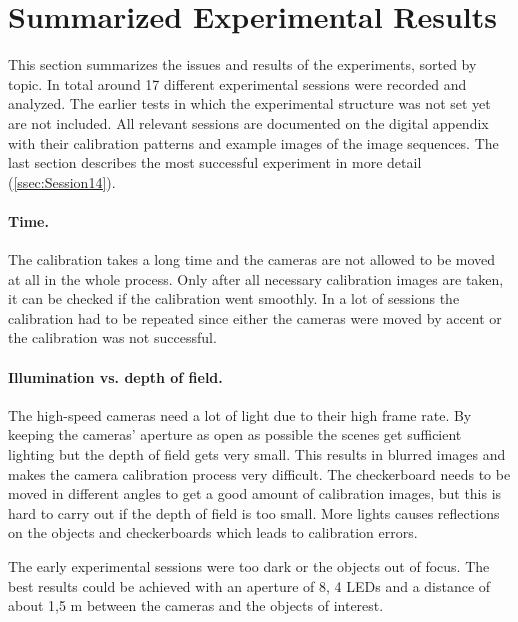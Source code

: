 \section{Summarized Experimental Results}\label{sec:ExperimentalResults}
This section summarizes the issues and results of the experiments, sorted by topic. In total around 17 different experimental sessions were recorded and analyzed. The earlier tests in which the experimental structure was not set yet are not included. All relevant sessions are documented on the digital appendix with their calibration patterns and example images of the image sequences. The last section describes the most successful experiment in more detail (\autoref{ssec:Session14}).

\paragraph{Time.}
The calibration takes a long time and the cameras are not allowed to be moved at all in the whole process. Only after all necessary calibration images are taken, it can be checked if the calibration went smoothly. In a lot of sessions the calibration had to be repeated since either the cameras were moved by accent or the calibration was not successful.

\paragraph{Illumination vs. depth of field.}
The high-speed cameras need a lot of light due to their high frame rate. By keeping the cameras' aperture as open as possible the scenes get sufficient lighting but the depth of field gets very small. This results in blurred images and makes the camera calibration process very difficult. The checkerboard needs to be moved in different angles to get a good amount of calibration images, but this is hard to carry out if the depth of field is too small. More lights causes reflections on the objects and checkerboards which leads to calibration errors.

The early experimental sessions were too dark or the objects out of focus. The best results could be achieved with an aperture of 8, 4 LEDs and a distance of about 1,5 m between the cameras and the objects of interest.

